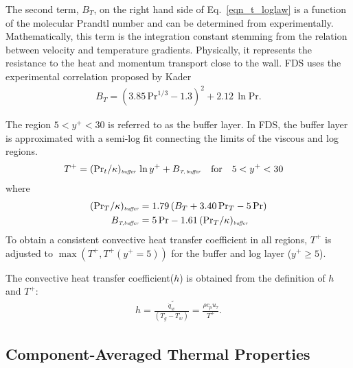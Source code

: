 The second term, $B_T$, on the right hand side of Eq.~\ref{eqn_t_loglaw} is a function of the molecular Prandtl number and can be determined from experimentally. Mathematically, this term is the integration constant stemming from the relation between velocity and temperature gradients. Physically, it represents the resistance to the heat and momentum transport close to the wall. FDS uses the experimental correlation proposed by Kader \cite{Kader:1981}
\begin{align}
\label{eqn_t_bt}
B_T =(3.85 \,\mbox{Pr}^{1/3}-1.3)^2 + 2.12 \,\ln\mbox{Pr}.
\end{align}

The region $5 < y^+ < 30$ is referred to as the buffer layer.  In FDS, the buffer layer is approximated with a semi-log fit connecting the limits of the viscous and log regions.
\begin{align}
\label{eqn_t_buffer_layer}
T^+ &= (\mbox{Pr}_t /\kappa)_{\mbox{\tiny\emph{buffer}}} \,\ln y^+ + B_{\mbox{\tiny\emph{T,\,buffer}}}  && \mbox{for} \quad 5 < y^+ < 30
\end{align}
where
\begin{align}
(\mbox{Pr}_T /\kappa)_{\mbox{\tiny\emph{buffer}}} &= 1.79\,(B_T + 3.40 \,\mbox{Pr}_T - 5 \,\mbox{Pr}) \\
B_{\mbox{\tiny\emph{T,buffer}}} &= 5 \,\mbox{Pr} - 1.61 \,(\mbox{Pr}_T /\kappa)_{\mbox{\tiny\emph{buffer}}}
\end{align}
To obtain a consistent convective heat transfer coefficient in all regions, $T^+$ is adjusted to $\max(T^+,T^+ (y^+ = 5))$ for the buffer and log layer ($y^+ \ge 5$).

The convective heat transfer coefficient($h$) is obtained from the definition of $h$ and $T^+$:
\begin{align}
\label{eqn_h_model}
h = \frac{\dot{q}_w^{''}}{(T_g - T_w)}= \frac{{\rho}{c_p}{u_{\tau}}}{T^+}.
\end{align}



\subsection{Component-Averaged Thermal Properties}
\label{matcoefs}

